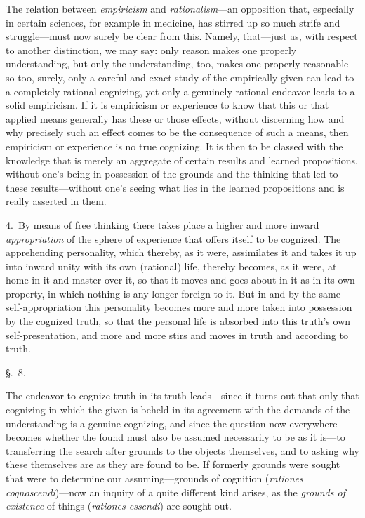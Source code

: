\documentclass[12pt,a4paper]{book}
\begin{document}
The relation between \emph{empiricism} and \emph{rationalism}---an opposition that,
especially in certain sciences, for example in medicine, has stirred up so much
strife and struggle---must now surely be clear from this. Namely, that---just as,
with respect to another distinction, we may say: only reason makes one properly
understanding, but only the understanding, too, makes one properly
reasonable---so too, surely, only a careful and exact study of the empirically
given can lead to a completely rational cognizing, yet only a genuinely rational
endeavor leads to a solid empiricism. If it is empiricism or experience to know
that this or that applied means generally has these or those effects, without
discerning how and why precisely such an effect comes to be the consequence of
such a means, then empiricism or experience is no true cognizing. It is then to be
classed with the knowledge that is merely an aggregate of certain results and
learned propositions, without one's being in possession of the grounds and the
thinking that led to these results---without one's seeing what lies in the learned
propositions and is really asserted in them.

4.~By means of free thinking there takes place a higher and more inward
\emph{appropriation} of the sphere of experience that offers itself to be cognized. The
apprehending personality, which thereby, as it were, assimilates it and takes it
up into inward unity with its own (rational) life, thereby becomes, as it were, at
home in it and master over it, so that it moves and goes about in it as in its own
property, in which nothing is any longer foreign to it. But in and by the same
self-appropriation this personality becomes more and more taken into possession by
the cognized truth, so that the personal life is absorbed into this truth's own
self-presentation, and more and more stirs and moves in truth and according to
truth.

\begin{center}\large\S.~8.\end{center}
The endeavor to cognize truth in its truth leads---since it turns out that only
that cognizing in which the given is beheld in its agreement with the demands of
the understanding is a genuine cognizing, and since the question now everywhere
becomes whether the found must also be assumed necessarily to be as it is---to
transferring the search after grounds to the objects themselves, and to asking
why these themselves are as they are found to be. If formerly grounds were sought
that were to determine our assuming---grounds of cognition (\textit{rationes
cognoscendi})---now an inquiry of a quite different kind arises, as the
\emph{grounds of existence} of things (\textit{rationes essendi}) are sought out.
\end{document}
